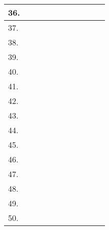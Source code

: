 \documentclass{article}
\begin{document}
\begin{small}
\begin{tabular}{|m{2cm}|m{2cm}|m{6mm}|m{2cm}|m{3cm}|m{6mm}|m{6mm}|m{6mm}|m{6mm}|m{6mm}|m{6mm}|}
36.&&&&&&&&&&\\
\hline
37.&&&&&&&&&&\\
\hline
38.&&&&&&&&&&\\
\hline
39.&&&&&&&&&&\\
\hline
40.&&&&&&&&&&\\
\hline
41.&&&&&&&&&&\\
\hline
42.&&&&&&&&&&\\
\hline
43.&&&&&&&&&&\\
\hline
44.&&&&&&&&&&\\
\hline
45.&&&&&&&&&&\\
\hline
46.&&&&&&&&&&\\
\hline
47.&&&&&&&&&&\\
\hline
48.&&&&&&&&&&\\
\hline
49.&&&&&&&&&&\\
\hline
50.&&&&&&&&&&\\
\hline
\end{tabular}
\end{small}

\newpage
\end{document}

